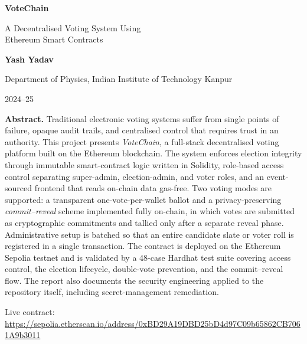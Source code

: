 \documentclass[11pt]{article}
\begin{document}
\begin{titlepage}
\centering
\vspace*{2cm}
{\Huge\bfseries VoteChain\par}
\vspace{0.5cm}
{\LARGE A Decentralised Voting System Using\\[0.2cm] Ethereum Smart Contracts\par}
\vspace{1.5cm}
{\large\bfseries Yash Yadav\par}
\vspace{0.3cm}
{\large Department of Physics, Indian Institute of Technology Kanpur\par}
\vspace{0.2cm}
{\large 2024--25\par}
\vspace{2cm}
\begin{minipage}{0.85\textwidth}
\small
\textbf{Abstract.} Traditional electronic voting systems suffer from single points of
failure, opaque audit trails, and centralised control that requires trust in an
authority. This project presents \emph{VoteChain}, a full-stack decentralised voting
platform built on the Ethereum blockchain. The system enforces election integrity
through immutable smart-contract logic written in Solidity, role-based access control
separating super-admin, election-admin, and voter roles, and an event-sourced frontend
that reads on-chain data gas-free. Two voting modes are supported: a transparent
one-vote-per-wallet ballot and a privacy-preserving \emph{commit--reveal} scheme
implemented fully on-chain, in which votes are submitted as cryptographic commitments
and tallied only after a separate reveal phase. Administrative setup is batched so that
an entire candidate slate or voter roll is registered in a single transaction. The
contract is deployed on the Ethereum Sepolia testnet and is validated by a 48-case
Hardhat test suite covering access control, the election lifecycle, double-vote
prevention, and the commit--reveal flow. The report also documents the security
engineering applied to the repository itself, including secret-management remediation.
\end{minipage}
\vfill
{\small Live contract: \url{https://sepolia.etherscan.io/address/0xBD29A19DBD25bD4d97C09b65862CB7061A9b3011}\par}
\end{titlepage}

\tableofcontents
\newpage
\end{document}

